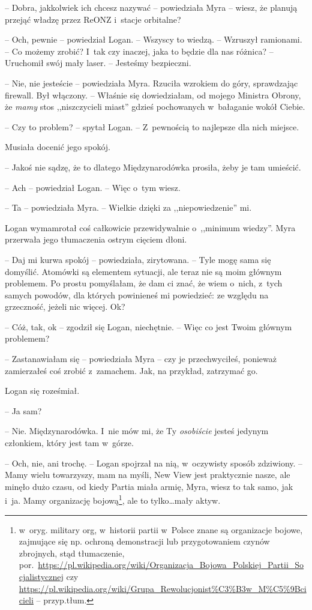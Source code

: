 \documentclass[oneside,polish,11pt,sfheadings]{mwbk}
\begin{document}
-- Dobra, jakkolwiek ich chcesz nazywać -- powiedziała Myra -- wiesz, że
planują przejąć władzę przez ReONZ i~stacje orbitalne?

-- Och, pewnie -- powiedział Logan. -- Wszyscy to wiedzą. -- Wzruszył
ramionami. -- Co możemy zrobić? I~tak czy inaczej, jaka to będzie dla nas
różnica? -- Uruchomił swój mały laser. -- Jesteśmy bezpieczni.

-- Nie, nie jesteście -- powiedziała Myra. Rzuciła wzrokiem do góry,
sprawdzając firewall. Był włączony. -- Właśnie się dowiedziałam, od
mojego Ministra Obrony, że \textit{mamy} stos ,,niszczycieli miast''
gdzieś pochowanych w~bałaganie wokół Ciebie.

-- Czy to problem? -- spytał Logan. -- Z~pewnością to najlepsze dla nich
miejsce.

Musiała docenić jego spokój.

-- Jakoś nie sądzę, że to dlatego Międzynarodówka prosiła, żeby je tam
umieścić.

-- Ach -- powiedział Logan. -- Więc o~tym wiesz.

-- Ta -- powiedziała Myra. -- Wielkie dzięki za ,,niepowiedzenie'' mi.

Logan wymamrotał coś całkowicie przewidywalnie o~,,minimum wiedzy''.
Myra przerwała jego tłumaczenia ostrym cięciem dłoni.

-- Daj mi kurwa spokój -- powiedziała, zirytowana. -- Tyle mogę sama się
domyślić. Atomówki są elementem sytuacji, ale teraz nie są moim głównym
problemem. Po prostu pomyślałam, że dam ci znać, że wiem o~nich, z~tych
samych powodów, dla których powinieneś mi powiedzieć: ze względu na
grzeczność, jeżeli nic więcej. Ok?

-- Cóż, tak, ok -- zgodził się Logan, niechętnie. -- Więc co jest Twoim
głównym problemem?

-- Zastanawiałam się -- powiedziała Myra -- czy je przechwyciłeś, ponieważ
zamierzałeś coś zrobić z~zamachem. Jak, na przykład, zatrzymać go.

Logan się roześmiał. 

-- Ja sam?

-- Nie. Międzynarodówka. I~nie mów mi, że Ty \textit{osobiście} jesteś
jedynym członkiem, który jest tam w~górze.

-- Och, nie, ani trochę. -- Logan spojrzał na nią, w~oczywisty sposób
zdziwiony. -- Mamy wielu towarzyszy, mam na myśli, New View jest
praktycznie nasze, ale minęło dużo czasu, od kiedy Partia miała armię,
Myra, wiesz to tak samo, jak i~ja. Mamy organizację bojową\footnote{ w~oryg.
military org, w~historii partii w~Polsce znane są organizacje bojowe,
zajmujące się np. ochroną demonstracji lub przygotowaniem czynów
zbrojnych, stąd tłumaczenie,
por.~\url{https://pl.wikipedia.org/wiki/Organizacja\_Bojowa\_Polskiej\_Partii\_Socjalistycznej}
czy
\url{https://pl.wikipedia.org/wiki/Grupa\_Rewolucjonist\%C3\%B3w\_M\%C5\%9Bcicieli}
-- przyp.tłum.}, ale to tylko\ldots mały aktyw.
\end{document}
